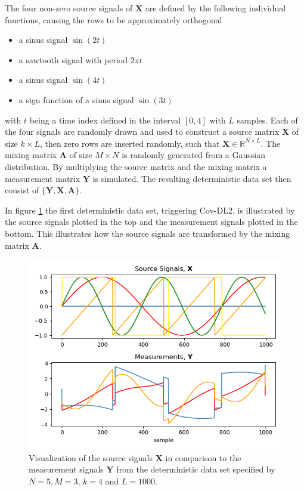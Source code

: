 The four non-zero source signals of $\mathbf{X}$ are defined by the following individual functions, causing the rows to be approximately orthogonal
\begin{itemize}
\item[1.] a sinus signal $\sin(2t)$
\item[2.] a sawtooth signal with period $2 \pi t$
\item[3.] a sinus signal $\sin(4t)$
\item[4.] a sign function of a sinus signal $\sin(3t)$
\end{itemize}
with $t$ being a time index defined in the interval $[0,4]$ with $L$ samples. 
Each of the four signals are randomly drawn and used to construct a source matrix $\mathbf{X}$ of size $k \times L$, then zero rows are inserted randomly, such that $\mathbf{X} \in \mathbb{R}^{N \times L}$. 
The mixing matrix $\mathbf{A}$ of size $M \times N$ is randomly generated from a Gaussian distribution. 
By multiplying the source matrix and the mixing matrix a measurement matrix $\mathbf{Y}$ is simulated.
The resulting deterministic data set then consist of $\{ \mathbf{Y}, \mathbf{X}, \mathbf{A} \}$.

In figure \ref{fig:simple} the first deterministic data set, triggering Cov-DL2, is illustrated by the source signals plotted in the top and the measurement signals plotted in the bottom. 
This illustrates how the source signals are transformed by the mixing matrix $\mathbf{A}$.
\begin{figure}[H]
\centering
\includegraphics[scale=0.5]{figures/ch_6/simple_data.png}
\caption{Visualization of the source signals $\mathbf{X}$ in comparison to the measurement signals $\mathbf{Y}$ from the deterministic data set specified by $N = 5, M = 3$, $k = 4$ and $L=1000$.}
\label{fig:simple}
\end{figure}
\noindent

